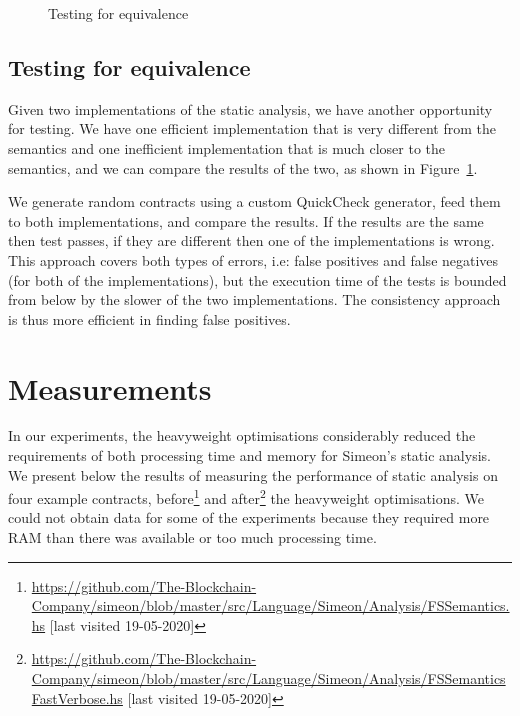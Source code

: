 \documentclass[english,runningheads]{llncs}
\begin{document}
\begin{figure}[h]
\begin{minipage}{.4\textwidth}
\begin{centering}
    \par\end{centering}
    \caption{Testing for equivalence\label{fig:Property-based-testing-for-equivalence}}
\end{minipage}
\end{figure}

\vspace*{-5mm}

\subsection{Testing for equivalence\label{subsec:Testing-for-equivalence} }

Given two  implementations of the static analysis, we have another opportunity
for testing. We have one efficient implementation that
is very different from the semantics and one inefficient implementation
that is much closer to the semantics, and we can compare the results of the
two, as shown in Figure~\ref{fig:Property-based-testing-for-equivalence}.

We generate random contracts using a custom QuickCheck \cite{quickcheck} generator,
 feed them to both implementations, and compare the results.
If the results are the same then test passes, if they are different then
one of the implementations is wrong.
This approach covers both types of errors, i.e: false positives and
false negatives (for both of the implementations), but the execution
time of the tests is bounded from below by the slower of the two implementations.
The consistency approach is thus more efficient in finding false positives.

\section{Measurements \label{sec:Measurements} }

In our experiments, the heavyweight optimisations considerably reduced
the requirements of both processing time and memory for Simeon's static
analysis. %
We present below the results of measuring the performance of static analysis on
four example contracts,
before\footnote{\url{https://github.com/The-Blockchain-Company/simeon/blob/master/src/Language/Simeon/Analysis/FSSemantics.hs} [last visited 19-05-2020]}
and after\footnote{\url{https://github.com/The-Blockchain-Company/simeon/blob/master/src/Language/Simeon/Analysis/FSSemanticsFastVerbose.hs} [last visited 19-05-2020]}
the heavyweight optimisations. We could not obtain data for some of the experiments because they
required more RAM than there was available or too much processing time.
\end{document}
